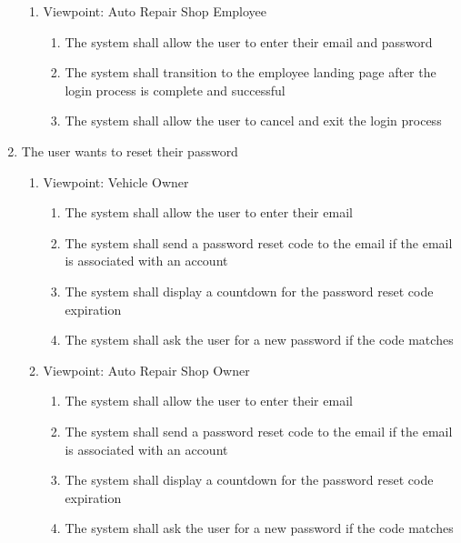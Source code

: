 \documentclass[12pt]{article}
\begin{document}
\begin{enumerate}[label=BE\arabic*., series=business_events]
\begin{enumerate}[VP\arabic*.]
		      \item Viewpoint: Auto Repair Shop Employee
		            \begin{enumerate}
			            \item The system shall allow the user to enter their email and password
			            \item The system shall transition to the employee landing page after the login process is complete and
			                  successful
			            \item The system shall allow the user to cancel and exit the login process
		            \end{enumerate}
	      \end{enumerate}

	\item The user wants to reset their password
	      \begin{enumerate}[VP\arabic*.]
		      \item Viewpoint: Vehicle Owner
		            \begin{enumerate}
			            \item The system shall allow the user to enter their email
			            \item The system shall send a password reset code to the email if the email is associated with an account
			            \item The system shall display a countdown for the password reset code expiration
			            \item The system shall ask the user for a new password if the code matches
		            \end{enumerate}

		      \item Viewpoint: Auto Repair Shop Owner
		            \begin{enumerate}
			            \item The system shall allow the user to enter their email
			            \item The system shall send a password reset code to the email if the email is associated with an account
			            \item The system shall display a countdown for the password reset code expiration
			            \item The system shall ask the user for a new password if the code matches
		            \end{enumerate}


\end{enumerate}
\end{enumerate}
\end{document}
